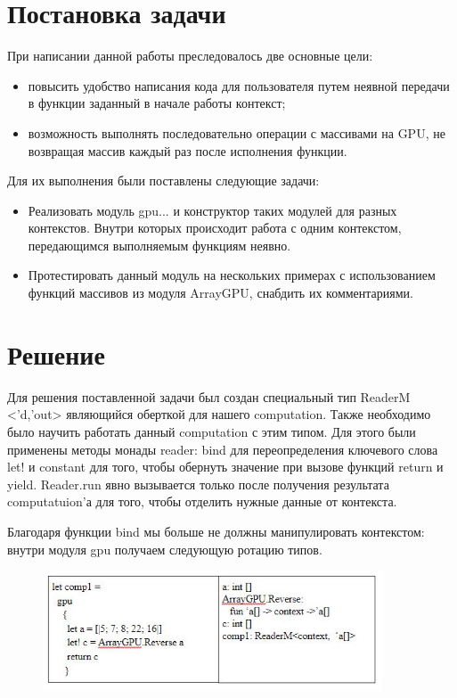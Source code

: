 \documentclass[14pt]{matmex-diploma-custom}
\begin{document}
\section{Постановка задачи}
При написании данной работы преследовалось две основные цели:
\begin{itemize}
    \item повысить удобство написания кода для пользователя путем   неявной передачи в функции заданный в начале работы контекст;
\item возможность выполнять последовательно операции с  массивами на GPU, не    возвращая массив каждый раз после исполнения функции.   
\end{itemize}
Для их выполнения были поставлены следующие задачи:
\begin{itemize}
    \item Реализовать модуль gpu{...} и конструктор таких модулей для разных контекстов. Внутри которых происходит работа с одним контекстом, передающимся выполняемым функциям неявно.
    \item Протестировать данный модуль на нескольких примерах с использованием функций массивов из модуля ArrayGPU, снабдить их комментариями.
\end{itemize}

\section{Решение}
Для решения поставленной задачи был создан специальный тип  
ReaderM <’d,’out> являющийся оберткой для нашего computation. Также необходимо было научить работать данный computation с этим типом. Для этого были применены методы монады reader: bind для переопределения ключевого слова let! и constant для того, чтобы обернуть значение при вызове функций return и yield. Reader.run явно вызывается только после получения результата computatuion’а для того, чтобы отделить нужные данные от контекста.

Благодаря функции bind мы больше не должны манипулировать контекстом: внутри модуля gpu получаем следующую ротацию типов.
\begin{figure}[h] 
\label{table}
\centering 
\includegraphics[width=0.9\textwidth]{images/types} 
\end{figure}
\end{document}
